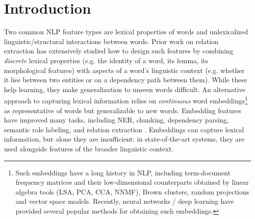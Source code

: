\documentclass[11pt,a4paper]{article}
\begin{document}
\section{Introduction}
Two common NLP feature types are lexical properties of words and unlexicalized
linguistic/structural interactions between words. Prior work on
relation extraction has
extensively studied how to design such features by combining
\emph{discrete} lexical properties (e.g. the identity of a word, its
lemma, its morphological features) with aspects of a word's linguistic
context (e.g. whether it lies between two entities or on a dependency
path between them). While these help learning, they make generalization to unseen words
difficult. An alternative approach to capturing lexical information relies on 
\emph{continuous} word embeddings\footnote{Such embeddings
  have a long history in NLP, including term-document frequency
  matrices and their low-dimensional counterparts obtained by linear
  algebra tools (LSA, PCA, CCA, NNMF), Brown clusters, random
  projections and vector space models. Recently, neural networks / deep
learning have provided several popular methods for obtaining such
embeddings.} as representative of words but generalizable to new words.
Embedding features have improved many tasks,
including NER, chunking, dependency parsing, semantic role
labeling, and relation extraction
\cite{miller_name_2004,turian2010word,koo_simple_2008,roth_composition_2014,sun_semi-supervised_2011,plank_embedding_2013,nguyen_employing_2014}.
Embeddings can capture lexical information, but alone they are
insufficient: in state-of-the-art systems, they are used
alongside features of the broader linguistic context.
\end{document}
